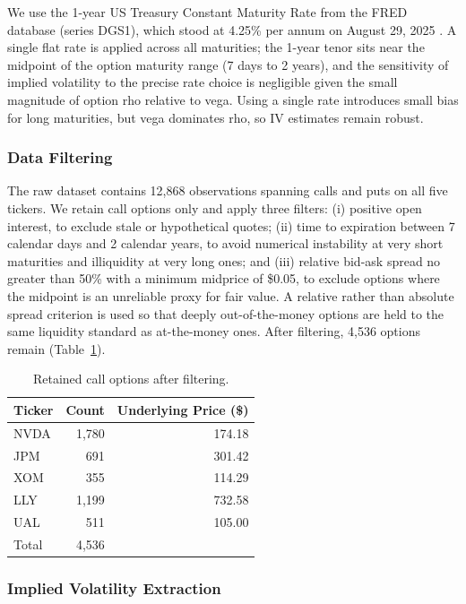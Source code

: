 \documentclass[12pt, a4paper]{article}
\begin{document}
We use the 1-year US Treasury Constant Maturity Rate from the FRED database (series
DGS1), which stood at 4.25\% per annum on August 29, 2025 \citep{FRED_DGS1}. A single
flat rate is applied across all maturities; the 1-year tenor sits near the midpoint of
the option maturity range (7 days to 2 years), and the sensitivity of implied volatility
to the precise rate choice is negligible given the small magnitude of option rho relative
to vega. Using a single rate introduces small bias for long maturities, but vega dominates rho,
so IV estimates remain robust.

\subsubsection{Data Filtering}

The raw dataset contains 12,868 observations spanning calls and puts on all five tickers.
We retain call options only and apply three filters: (i) positive open interest, to
exclude stale or hypothetical quotes; (ii) time to expiration between 7 calendar days
and 2 calendar years, to avoid numerical instability at very short maturities and
illiquidity at very long ones; and (iii) relative bid-ask spread no greater than 50\%
with a minimum midprice of \$0.05, to exclude options where the midpoint is an
unreliable proxy for fair value. A relative rather than absolute spread criterion is used
so that deeply out-of-the-money options are held to the same liquidity standard as
at-the-money ones. After filtering, 4,536 options remain (Table~\ref{tab:filter}).

\begin{table}[H]
\centering
\caption{Retained call options after filtering.}
\label{tab:filter}
\begin{tabular}{lrr}
\toprule
Ticker & Count & Underlying Price (\$) \\
\midrule
NVDA & 1,780 & 174.18 \\
JPM  &   691 & 301.42 \\
XOM  &   355 & 114.29 \\
LLY  & 1,199 & 732.58 \\
UAL  &   511 & 105.00 \\
\midrule
Total & 4,536 & \\
\bottomrule
\end{tabular}
\end{table}

\subsubsection{Implied Volatility Extraction}
\end{document}
